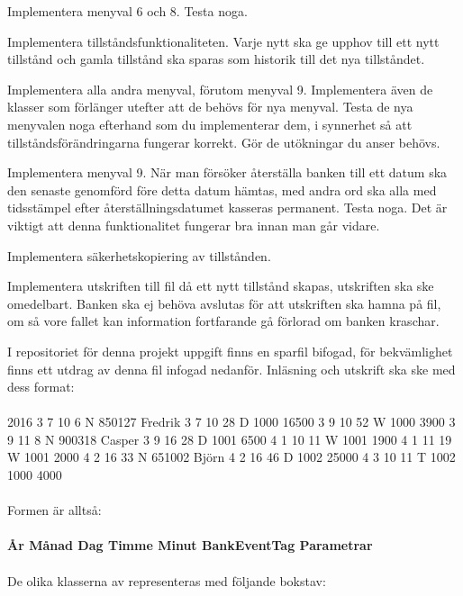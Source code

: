 \Subtask Implementera menyval 6 och 8. Testa noga.

\Subtask Implementera tillståndsfunktionaliteten. Varje nytt  ska ge upphov till ett nytt tillstånd och gamla tillstånd ska sparas som historik till det nya tillståndet.

\Subtask Implementera alla andra menyval, förutom menyval 9. Implementera även de klasser som förlänger  utefter att de behövs för nya menyval.
Testa de nya menyvalen noga efterhand som du implementerar dem, i synnerhet så att tillståndsförändringarna fungerar korrekt. Gör de utökningar du anser behövs.

\Task Implementera menyval 9. När man försöker återställa banken till ett datum ska den senaste  genomförd före detta datum hämtas, med andra ord ska alla  med tidsstämpel efter återställningsdatumet kasseras permanent. Testa noga. Det är viktigt att denna funktionalitet fungerar bra innan man går vidare.

\Task Implementera säkerhetskopiering av tillstånden.

\Subtask Implementera utskriften till fil då ett nytt tillstånd skapas, utskriften ska ske omedelbart. Banken ska ej behöva avslutas för att utskriften ska hamna på fil, om så vore fallet kan information fortfarande gå förlorad om banken kraschar.

I repositoriet för denna projekt uppgift finns en sparfil bifogad, för bekvämlighet finns ett utdrag av denna fil  infogad nedanför. Inläsning och utskrift ska ske med dess format:\\~\\
2016 3 7 10 6 N 850127 Fredrik 3 7 10 28 D 1000 16500 3 9 10 52 W 1000 3900 3 9 11 8 N 900318 Casper 3 9 16 28 D 1001 6500 4 1 10 11 W 1001 1900 4 1 11 19 W 1001 2000 4 2 16 33 N 651002 Björn 4 2 16 46 D 1002 25000 4 3 10 11 T 1002 1000 4000\\~\\
Formen är alltså:\\~\\
\textbf{År  Månad  Dag  Timme  Minut  BankEventTag  Parametrar}
\\~\\
De olika klasserna av  representeras med följande bokstav:


